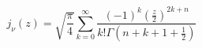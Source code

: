 \documentclass[12pt]{article}
\begin{document}
\begin{displaymath}
j_\nu(z) = \sqrt{\frac{\pi}{4}} \sum_{k=0}^\infty
    \frac{\left(-1\right)^k (\frac{z}{2})^{2k+n}}{k! \Gamma(n+k+1+\frac{1}{2})}
\end{displaymath}
\end{document}
